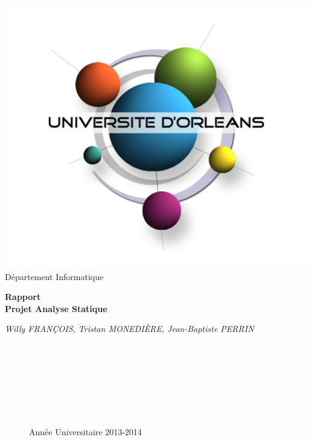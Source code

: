 \documentclass[12pt,a4paper,oneside]{article}
\begin{document}
\begin{titlepage}
\begin{flushright}
           \includegraphics[scale=0.1]{images/univ_orleans}\\ 
                      Département Informatique
\end{flushright}
\begin{center}
\textbf{
\huge{Rapport}\\
\vspace{2mm}
\huge{Projet Analyse Statique}\\
}

\vspace{15mm}
\begin{large}
	\textit{Willy FRANÇOIS, Tristan MONEDIÈRE, Jean-Baptiste PERRIN}
\end{large}

\begin{figure}[b!]
\begin{flushright}
~~\\ ~~\\ ~~\\ ~~\\ ~~\\ ~~\\ ~~\\
\large{Année Universitaire 2013-2014}
\end{flushright}
\end{figure}
\end{center}
\end{titlepage}
\end{document}
